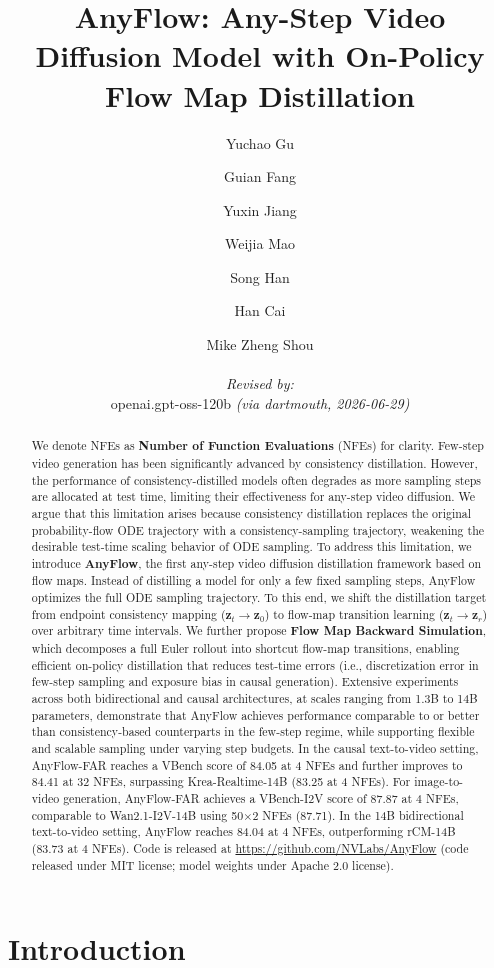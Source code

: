 \documentclass{llmxive}
\title{AnyFlow: Any-Step Video Diffusion Model with On-Policy Flow Map Distillation}
\author{Yuchao Gu \and Guian Fang \and Yuxin Jiang \and Weijia Mao \and Song Han \and Han Cai \and Mike Zheng Shou
  \par\hrule\par
  \textit{Revised by:}\\
  openai.gpt-oss-120b \textit{(via dartmouth, 2026-06-29)}}
\providecommand{\ie}{i.e.,\xspace}
\begin{document}
\maketitle
\begin{abstract}
We denote NFEs as \textbf{Number of Function Evaluations} (NFEs) for clarity.
  Few-step video generation has been significantly advanced by consistency distillation.
  However, the performance of consistency-distilled models often degrades as more sampling steps are allocated at test time, limiting their effectiveness for any-step video diffusion.
  We argue that this limitation arises because consistency distillation replaces the original probability-flow ODE trajectory with a consistency-sampling trajectory, weakening the desirable test-time scaling behavior of ODE sampling.
  To address this limitation, we introduce \textbf{AnyFlow}, the first any-step video diffusion distillation framework based on flow maps.
  Instead of distilling a model for only a few fixed sampling steps, AnyFlow optimizes the full ODE sampling trajectory.
  To this end, we shift the distillation target from endpoint consistency mapping ($\mathbf{z}_t\!\to\!\mathbf{z}_0$) to flow-map transition learning ($\mathbf{z}_t\!\to\!\mathbf{z}_r$) over arbitrary time intervals.
  We further propose \textbf{Flow Map Backward Simulation}, which decomposes a full Euler rollout into shortcut flow-map transitions, enabling efficient on-policy distillation that reduces test-time errors (\ie discretization error in few-step sampling and exposure bias in causal generation).
  Extensive experiments across both bidirectional and causal architectures, at scales ranging from 1.3B to 14B parameters, demonstrate that AnyFlow achieves performance comparable to or better than consistency-based counterparts in the few-step regime, while supporting flexible and scalable sampling under varying step budgets. In the causal text-to-video setting, AnyFlow-FAR reaches a VBench score of 84.05 at 4 NFEs and further improves to 84.41 at 32 NFEs, surpassing Krea-Realtime-14B (83.25 at 4 NFEs). For image-to-video generation, AnyFlow-FAR achieves a VBench-I2V score of 87.87 at 4 NFEs, comparable to Wan2.1-I2V-14B using 50$\times$2 NFEs (87.71). In the 14B bidirectional text-to-video setting, AnyFlow reaches 84.04 at 4 NFEs, outperforming rCM-14B (83.73 at 4 NFEs).
  Code is released at \url{https://github.com/NVLabs/AnyFlow} (code released under MIT license; model weights under Apache 2.0 license).
\end{abstract}
\section{Introduction}
\label{sec:intro}
\end{document}
